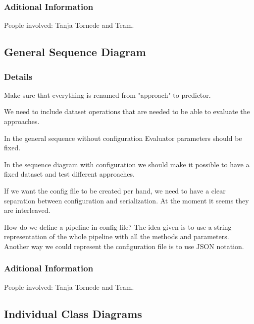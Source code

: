 \documentclass[11pt]{meetingmins} %
\begin{document}
\subsubsection{Aditional Information}
\begin{hiddensubitems}
	\item People involved: Tanja Tornede and Team.
\end{hiddensubitems}

\subsection{General Sequence Diagram}
\subsubsection{Details}
\begin{hiddensubitems}
	\item Make sure that everything is renamed from "approach" to predictor.
	\item We need to include dataset operations that are needed to be able to evaluate the approaches.
	\item In the general sequence without configuration Evaluator parameters should be fixed.
	\item In the sequence diagram with configuration we should make it possible to have a fixed dataset and test different approaches.
	\item If we want the config file to be created per hand, we need to have a clear separation between configuration and serialization. At the moment it seems they are interleaved.
	\item How do we define a pipeline in config file?
	The idea given is to use a string representation of the whole pipeline with
	all the methods and parameters. Another way we could represent the configuration
	file is to use JSON notation.
\end{hiddensubitems}
\subsubsection{Aditional Information}
\begin{hiddensubitems}
	\item People involved: Tanja Tornede and Team.
\end{hiddensubitems}

\subsection{Individual Class Diagrams}
\end{document}
